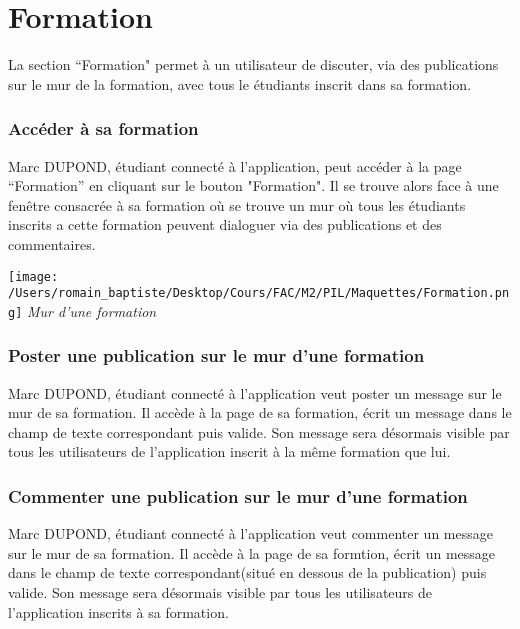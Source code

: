 \section*{Formation}
La section “Formation" permet à un utilisateur de discuter, via des publications sur le mur de la formation, avec tous le étudiants inscrit dans sa formation.
\subsubsection*{Accéder à sa formation}
Marc DUPOND, étudiant connecté à l’application, peut accéder à la page “Formation” en cliquant sur le bouton "Formation". Il se trouve alors face à une fenêtre consacrée à sa formation où se trouve un mur où tous les étudiants inscrits a cette formation peuvent dialoguer via des publications et des commentaires. 
\begin{center}
\texttt{[image: /Users/romain\_baptiste/Desktop/Cours/FAC/M2/PIL/Maquettes/Formation.png]}
\emph{Mur d'une formation}
\end{center}
\subsubsection*{Poster une publication sur le mur d'une formation}

Marc DUPOND, étudiant connecté à l’application veut poster un message sur le mur de sa formation. Il accède à la page de sa formation, écrit un message dans le champ de texte correspondant puis valide. Son message sera désormais visible par tous les utilisateurs de l’application inscrit à la même formation que lui.

\subsubsection*{Commenter une publication sur le mur d'une formation}

Marc DUPOND, étudiant connecté à l’application veut commenter un message sur le mur de sa formation. Il accède à la page de sa formtion, écrit un message dans le champ de texte correspondant(situé en dessous de la publication) puis valide. Son message sera désormais visible par tous les utilisateurs de l’application inscrits à sa formation.
